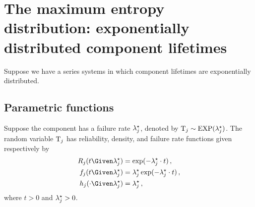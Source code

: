 \documentclass[../main.tex]{subfiles}
\begin{document}
\chapter{The maximum entropy distribution: exponentially distributed component lifetimes}
\label{sec:common_distributions}
Suppose we have a series systems in which component lifetimes are exponentially 
distributed.

\section{Parametric functions}
Suppose the \jth component has a failure rate ${\lambda}^{\star}_j$, denoted by 
$\mathrm{T}_j \sim \text{EXP}({\lambda}^{\star}_j)$. The random variable $\mathrm{T}_j$ has 
reliability, density, and failure rate functions given respectively by
\begin{align}
    \label{eq:expo_reliability}
    \srv_j(t \Given \tparam\lambda_j) &=
        \exp(-\tparam\lambda_j \cdot t)\,,\\
    \label{eq:expo_pdf}
    \pdf_j(t \Given \tparam\lambda_j) &=
        \tparam\lambda_j \exp(-\tparam\lambda_j \cdot t)\,,\\
    \label{eq:expo_haz}
    \haz_j(\cdot \Given \tparam\lambda_j) &=
        \tparam{\lambda}_j\,,
\end{align}
where $t > 0$ and ${\lambda}^{\star}_j > 0$.
\end{document}

